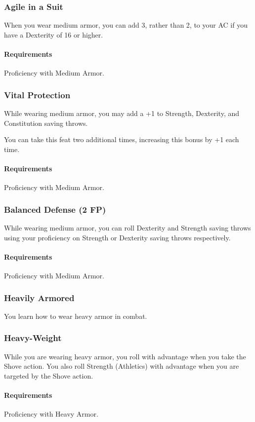\subsubsection{Agile in a Suit} \label{feat::agileinasuit}
    When you wear medium armor, you can add 3, rather than 2, to your AC if you have a Dexterity of 16 or higher.
    \paragraph{Requirements} Proficiency with Medium Armor.
\subsubsection{Vital Protection} \label{feat::vitalprotection}
    While wearing medium armor, you may add a +1 to Strength, Dexterity, and Constitution saving throws.

    You can take this feat two additional times, increasing this bonus by +1 each time.
    \paragraph{Requirements} Proficiency with Medium Armor.
\subsubsection{Balanced Defense (2 FP)} \label{feat::balanceddefense}
    While wearing medium armor, you can roll Dexterity and Strength saving throws using your proficiency on Strength or Dexterity saving throws respectively.
    \paragraph{Requirements} Proficiency with Medium Armor.
\subsubsection{Heavily Armored} \label{feat::heavilyarmored}
    You learn how to wear heavy armor in combat.
\subsubsection{Heavy-Weight} \label{feat::heavyweight}
    While you are wearing heavy armor, you roll with advantage when you take the Shove action.
    You also roll Strength (Athletics) with advantage when you are targeted by the Shove action.
    \paragraph{Requirements} Proficiency with Heavy Armor.
